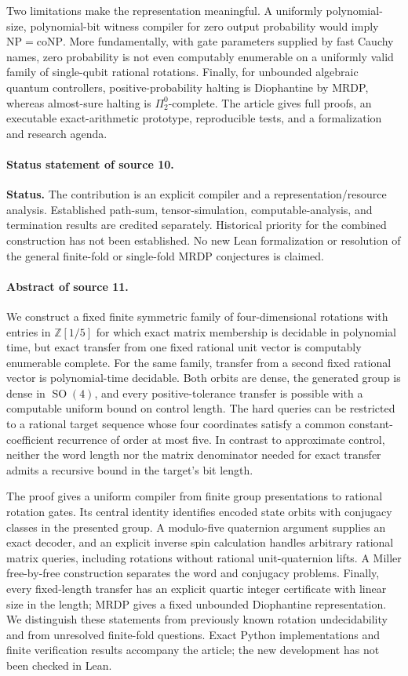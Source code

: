 \documentclass[11pt,letterpaper]{article}
\numberwithin{equation}{section}
\theoremstyle{definition}
\theoremstyle{remark}
\newcommand{\Z}{\mathbb Z}
\newcommand{\SO}{\operatorname{SO}}
\begin{document}
Two limitations make the representation meaningful. A uniformly polynomial-size,
polynomial-bit witness compiler for zero output probability would imply
$\mathrm{NP}=\mathrm{coNP}$. More fundamentally, with gate parameters supplied by
fast Cauchy names, zero probability is not even computably enumerable on a
uniformly valid family of single-qubit rational rotations. Finally, for
unbounded algebraic quantum controllers, positive-probability halting is
Diophantine by MRDP, whereas almost-sure halting is $\Pi^0_2$-complete.
The article gives full proofs, an executable exact-arithmetic prototype,
reproducible tests, and a formalization and research agenda.
\paragraph{Status statement of source 10.}
\noindent\textbf{Status.} The contribution is an explicit compiler and a
representation/resource analysis. Established path-sum, tensor-simulation,
computable-analysis, and termination results are credited separately. Historical
priority for the combined construction has not been established. No new Lean
formalization or resolution of the general finite-fold or single-fold MRDP
conjectures is claimed.
\paragraph{Abstract of source 11.}
We construct a fixed finite symmetric family of four-dimensional rotations
with entries in $\Z[1/5]$ for which exact matrix membership is decidable in
polynomial time, but exact transfer from one fixed rational unit vector is
computably enumerable complete. For the same family, transfer from a second
fixed rational vector is polynomial-time decidable. Both orbits are dense,
the generated group is dense in $\SO(4)$, and every positive-tolerance transfer
is possible with a computable uniform bound on control length. The hard
queries can be restricted to a rational target sequence whose four
coordinates satisfy a common constant-coefficient recurrence of order at
most five. In contrast to approximate control, neither the word length nor
the matrix denominator needed for exact transfer admits a recursive bound
in the target's bit length.

The proof gives a uniform compiler from finite group presentations to
rational rotation gates. Its central identity identifies encoded state
orbits with conjugacy classes in the presented group. A modulo-five
quaternion argument supplies an exact decoder, and an explicit inverse
spin calculation handles arbitrary rational matrix queries, including
rotations without rational unit-quaternion lifts. A Miller free-by-free
construction separates the word and conjugacy problems. Finally, every
fixed-length transfer has an explicit quartic integer certificate with
linear size in the length; MRDP gives a fixed unbounded Diophantine
representation. We distinguish these statements from previously known
rotation undecidability and from unresolved finite-fold questions. Exact
Python implementations and finite verification results accompany the
article; the new development has not been checked in Lean.
\end{document}
